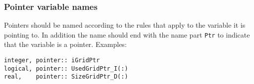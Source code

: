 \documentclass{article}
\begin{document}
\subsubsection{Pointer variable names}

Pointers should be named according to the rules that apply to the variable
it is pointing to. In addition the name should end with the name part 
{\tt Ptr} to indicate that the variable is a pointer. Examples:
\begin{verbatim}
integer, pointer:: iGridPtr
logical, pointer:: UsedGridPtr_I(:)
real,    pointer:: SizeGridPtr_D(:)
\end{verbatim}
\end{document}
